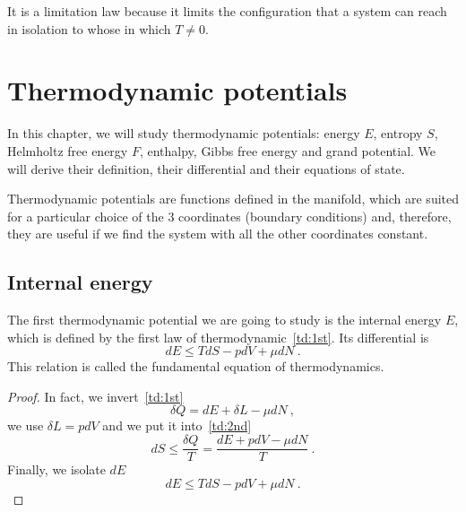     It is a limitation law because it limits the configuration that a system can reach in isolation to whose in which $T \neq 0$.

\chapter{Thermodynamic potentials}

    In this chapter, we will study thermodynamic potentials: energy $E$, entropy $S$, Helmholtz free energy $F$, enthalpy, Gibbs free energy and grand potential. We will derive their definition, their differential and their equations of state. 
    
    Thermodynamic potentials are functions defined in the manifold, which are suited for a particular choice of the $3$ coordinates (boundary conditions) and, therefore, they are useful if we find the system with all the other coordinates constant. 
    
\section{Internal energy}
    
    The first thermodynamic potential we are going to study is the internal energy $E$, which is defined by the first law of thermodynamic~\eqref{td:1st}. Its differential is
    \begin{equation}\label{td:d:e}
        dE \leq T dS - pdV + \mu dN ~.
    \end{equation}
    This relation is called the fundamental equation of thermodynamics.
    \begin{proof}
        In fact, we invert~\eqref{td:1st}
        \begin{equation*}
            \delta Q = dE + \delta L - \mu dN ~,
        \end{equation*}
        we use $\delta L = p dV$ and we put it into~\eqref{td:2nd}
        \begin{equation}
            dS \leq \frac{\delta Q}{T} = \frac{dE + p dV - \mu dN}{T} ~.
        \end{equation}
        Finally, we isolate $dE$
        \begin{equation}
            dE \leq TdS - p dV + \mu dN ~.
        \end{equation}
    \end{proof} 

